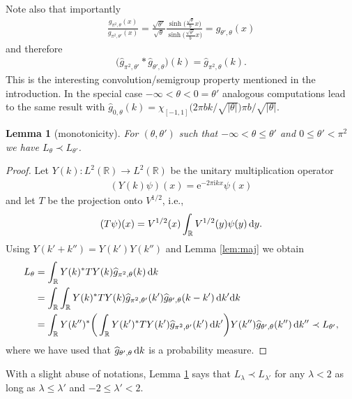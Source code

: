 \documentclass[pdftex]{sigma}%
\numberwithin{equation}{section}
\newtheorem{Lemma}[Theorem]{Lemma}
\newcommand{\e}{\mathrm{e}}
\newcommand{\ii}{\mathrm{i}}
\newcommand{\R}{\mathbb{R}}
\begin{document}
Note also that importantly
\begin{gather*}
\frac{g_{\pi^2,\theta}(x)}{g_{\pi^2,\theta'}(x)}
=\frac{\sqrt{\theta'}}{\sqrt{\theta}}\frac{\sinh\big(\frac{\sqrt{\theta}}{b}x\big)} {\sinh\big(\frac{\sqrt{\theta'}}{b}x\big)}=g_{\theta',\theta}(x)
\end{gather*}
and therefore
\begin{gather*}
\big(\widehat{g}_{\pi^2,\theta'}*\widehat{g}_{\theta',\theta}\big)(k)=\widehat{g}_{\pi^2,\theta}(k).
\end{gather*}
This is the interesting convolution/semigroup property mentioned in the introduction. In the special case $-\infty<\theta <0=\theta'$ analogous computations lead to the same result with $\widehat{g}_{0,\theta}(k)=\chi_{[-1,1]}\big(2\pi bk/\sqrt{|\theta|}\big)\pi b/\sqrt{|\theta|}$.

\begin{Lemma}[monotonicity]\label{Mon}
For $(\theta, \theta')$ such that $-\infty<\theta \le \theta'$ and $0\le\theta' <\pi^2$ we have $L_\theta\prec L_{\theta'}$.
\end{Lemma}

\begin{proof}
Let $Y(k)\colon L^2(\R)\to L^2(\R)$ be the unitary multiplication operator
\begin{gather*}
(Y(k)\psi)(x)=\e^{-2\pi \ii k x}\psi(x)
\end{gather*}
and let $T$ be the projection onto $V^{1/2}$, i.e.,
\begin{gather*}
(T\psi)(x)=V^{1/2} (x) \int_\R V^{1/2}(y) \psi(y) \, {\rm d} y.
\end{gather*}
Using $Y(k'+k'')=Y(k')Y(k'')$ and Lemma \ref{lem:maj} we obtain
\begin{align*}
L_{\theta}&=\int_\R Y(k)^*T Y(k) \widehat{g}_{\pi^2,\theta}(k)\, {\rm d} k
\\
&=\int_\R\int_{\R} Y(k)^*T Y(k) \widehat{g}_{\pi^2,\theta'}(k') \widehat{g}_{\theta',\theta}(k-k')\, {\rm d} k' {\rm d} k
\\
&=\int_\R Y(k'')^*\bigg(\int_{\R} Y(k')^*T Y(k') \widehat{g}_{\pi^2,\theta'}(k')\, {\rm d} k'\bigg)Y(k'') \widehat{g}_{\theta',\theta}(k'')\, {\rm d} k'' \prec L_{\theta'},
\end{align*}
where we have used that $\widehat{g}_{\theta',\theta} \, {\rm d} k$ is a probability measure.
\end{proof}

\begin{Remark}
With a slight abuse of notations, Lemma \ref{Mon} says that $L_{\lambda}\prec L_{\lambda'}$ for any $\lambda<2$ as long as $\lambda\le \lambda'$ and $-2\le\lambda' <2$.
\end{Remark}
\end{document}
